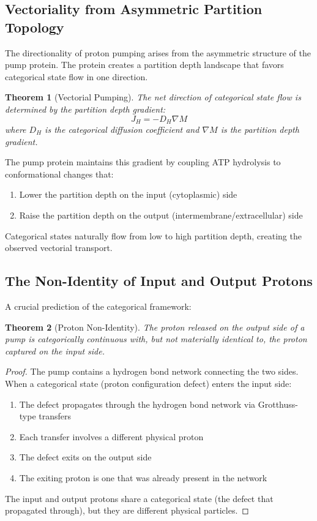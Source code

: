 \documentclass[twocolumn,showpacs,preprintnumbers,amsmath,amssymb,prd]{revtex4-2}
\newtheorem{theorem}{Theorem}[section]
\begin{document}
\subsection{Vectoriality from Asymmetric Partition Topology}

The directionality of proton pumping arises from the asymmetric structure of the pump protein. The protein creates a partition depth landscape that favors categorical state flow in one direction.

\begin{theorem}[Vectorial Pumping]
\label{thm:vectorial}
The net direction of categorical state flow is determined by the partition depth gradient:
\begin{equation}
J_H = -D_H \nabla M
\label{eq:categorical_flux}
\end{equation}
where $D_H$ is the categorical diffusion coefficient and $\nabla M$ is the partition depth gradient.
\end{theorem}

The pump protein maintains this gradient by coupling ATP hydrolysis to conformational changes that:
\begin{enumerate}
\item Lower the partition depth on the input (cytoplasmic) side
\item Raise the partition depth on the output (intermembrane/extracellular) side
\end{enumerate}

Categorical states naturally flow from low to high partition depth, creating the observed vectorial transport.

\subsection{The Non-Identity of Input and Output Protons}

A crucial prediction of the categorical framework:

\begin{theorem}[Proton Non-Identity]
\label{thm:nonidentity}
The proton released on the output side of a pump is categorically continuous with, but not materially identical to, the proton captured on the input side.
\end{theorem}

\begin{proof}
The pump contains a hydrogen bond network connecting the two sides. When a categorical state (proton configuration defect) enters the input side:
\begin{enumerate}
\item The defect propagates through the hydrogen bond network via Grotthuss-type transfers
\item Each transfer involves a different physical proton
\item The defect exits on the output side
\item The exiting proton is one that was already present in the network
\end{enumerate}

The input and output protons share a categorical state (the defect that propagated through), but they are different physical particles.
\end{proof}
\end{document}
